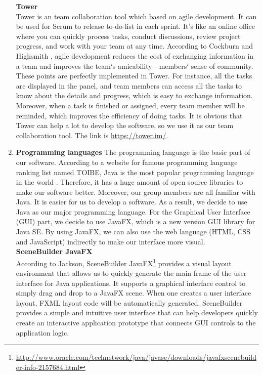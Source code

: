 \documentclass[paper=a4, fontsize=11pt,twoside]{scrartcl}		%
\begin{document}
\begin{enumerate}
    \textbf{Tower}\\
Tower is an team collaboration tool which based on agile development. It can be used for Scrum to release to-do-list in each sprint. It’s like an online office where you can quickly process tasks, conduct discussions, review project progress, and work with your team at any time. According to Cockburn and Highsmith \cite{cockburn2001agile}, agile development reduces the cost of exchanging information in a team and improves the team‘s amicability—members‘ sense of community. These points are perfectly implemented in Tower. For instance, all the tasks are displayed in the panel, and team members can access all the tasks to know about the details and progress, which is easy to exchange information. Moreover, when a task is finished or assigned, every team member will be reminded, which improves the efficiency of doing tasks. It is obvious that Tower can help a lot to develop the software, so we use it as our team collaboration tool. The link is \url{https://tower.im/}.




\item \textbf{Programming languages}
The programming language is the basic part of our software. According to a website for famous programming language ranking list named TOIBE, Java is the most popular programming language in the world \cite{TIOBE2016}. Therefore, it has a huge amount of open source libraries to make our software better. Moreover, our group members are all familiar with Java. It is easier for us to develop a software. As a result, we decide to use Java as our major programming language. For the Graphical User Interface (GUI) part, we decide to use JavaFX, which is a new version GUI library for Java SE. By using JavaFX, we can also use the web language (HTML, CSS and JavaScript) indirectly to make our interface more visual.\\

\textbf{SceneBuilder JavaFX}\\
    According to Jackson, SceneBuilder JavaFX\footnote{\url{http://www.oracle.com/technetwork/java/javase/downloads/javafxscenebuilder-info-2157684.html}} provides a visual layout environment that allows us to quickly generate the main frame of the user interface for Java applications\cite{jackson2014introduction}. It supports a graphical interface control to simply drag and drop to a JavaFX scene. When one creates a user interface layout, FXML layout code will be automatically generated. SceneBuilder provides a simple and intuitive user interface that can help developers quickly create an interactive application prototype that connects GUI controls to the application logic. 
    

\end{enumerate}
\end{document}
